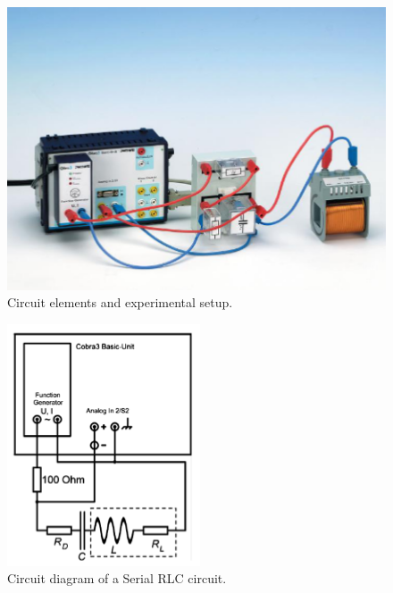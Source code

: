 \documentclass[journal]{IEEEtran}
\begin{document}
\begin{figure}[H]
    \centering
    \includegraphics[width=\linewidth]{IMAGES/Experimental_setup.png}
    \caption{Circuit elements and experimental setup.}
    \label{fig:experimental_setup}
\end{figure}

\begin{figure}[H]
    \centering
    \includegraphics[width=0.5\linewidth]{IMAGES/series_diagram.png}
    \caption{Circuit diagram of a Serial RLC circuit.}
    \label{fig:serial_circuit}
\end{figure}
\end{document}
